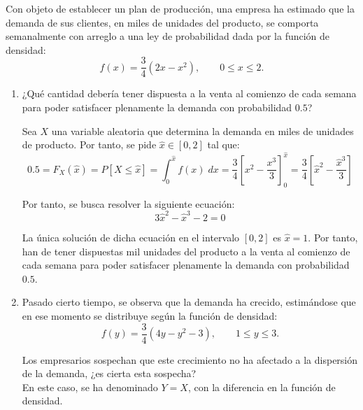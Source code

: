 \begin{ejercicio}
    Con objeto de establecer un plan de producción, una empresa ha estimado que la demanda de sus clientes, en miles de unidades del producto, se comporta semanalmente con arreglo a una ley de probabilidad dada por la función de densidad:
    \begin{equation*}
        f(x)=\frac{3}{4}(2x-x^2),\qquad 0\leq x \leq 2.
    \end{equation*}


    \begin{enumerate}
        \item ¿Qué cantidad debería tener dispuesta a la venta al comienzo de cada semana para poder satisfacer plenamente la demanda con probabilidad $0.5$?

        Sea $X$ una variable aleatoria que determina la demanda en miles de unidades de producto. Por tanto, se pide $\hat{x}\in [0,2]$ tal que:
        \begin{equation*}
             0.5 = F_X(\hat{x}) = P[X\leq \hat{x}] = \int_0^{\hat{x}} f(x)\;dx = \frac{3}{4}\left[x^2-\frac{x^3}{3}\right]_0^{\hat{x}}
             = \frac{3}{4}\left[\hat{x}^2-\frac{\hat{x}^3}{3}\right]
        \end{equation*}

        Por tanto, se busca resolver la siguiente ecuación:
        \begin{equation*}
            3\hat{x}^2 - \hat{x}^3-2=0
        \end{equation*}

        La única solución de dicha ecuación en el intervalo $[0,2]$ es $\hat{x}=1$. Por tanto, han de tener dispuestas mil unidades del producto a la venta al comienzo de cada semana para poder satisfacer plenamente la demanda con probabilidad $0.5$.

        \item Pasado cierto tiempo, se observa que la demanda ha crecido, estimándose que en ese momento se distribuye según la función de densidad:
        \begin{equation*}
            f(y)=\frac{3}{4} (4y-y^2-3),\qquad 1\leq y \leq 3.
        \end{equation*}

        Los empresarios sospechan que este crecimiento no ha afectado a la dispersión de la demanda, ¿es cierta esta sospecha?\\

        En este caso, se ha denominado $Y=X$, con la diferencia en la función de densidad.


\end{enumerate}
\end{ejercicio}
